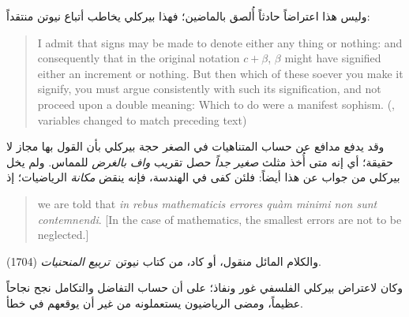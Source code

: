 \documentclass[../../../include/open-logic-section]{subfiles}
\begin{document}
وليس هذا اعتراضاً حادثاً أُلصق بالماضين؛ فهذا بيركلي يخاطب أتباع نيوتن
منتقداً:
\begin{quote}
I admit that signs may be made to denote either any thing or nothing:
and consequently that in the original notation $c + \beta$, $\beta$
might have signified either an increment or nothing. But then which of
these soever you make it signify, you must argue consistently with
such its signification, and not proceed upon a double meaning: Which
to do were a manifest sophism. (\citealt[\S{}XIII]{Berkeley1734},
variables changed to match preceding text)
\end{quote}
وقد يدفع مدافع عن حساب المتناهيات في الصغر حجة بيركلي بأن القول بها مجاز
لا حقيقة؛ أي إنه متى أُخذ مثلث \emph{صغير جداً} حصل تقريب \emph{واف
بالغرض} للمماس. ولم يخل بيركلي من جواب عن هذا أيضاً: فلئن كفى في الهندسة،
فإنه ينقض \emph{مكانة} الرياضيات؛ إذ
\begin{quote}
we are told that \emph{in rebus mathematicis errores qu\`{a}m minimi
non sunt contemnendi}. [In the case of mathematics, the smallest
errors are not to be neglected.] \citep[\S{}IX]{Berkeley1734}
\end{quote}
والكلام المائل منقول، أو كاد، من كتاب نيوتن~\emph{تربيع المنحنيات}
(1704).

وكان لاعتراض بيركلي الفلسفي غور ونفاذ؛ على أن حساب التفاضل والتكامل نجح
نجاحاً عظيماً، ومضى الرياضيون يستعملونه من غير أن يوقعهم في خطأ.
\end{document}
